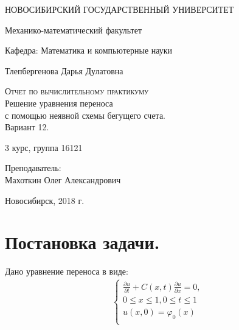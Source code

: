 \documentclass[12pt,a4paper]{scrartcl}
\begin{document}
	\begin{titlepage}
		\begin{center}
			
			\vspace{0.5cm}
			
			НОВОСИБИРСКИЙ ГОСУДАРСТВЕННЫЙ УНИВЕРСИТЕТ
			\vspace{0.25cm}
			
			Механико-математический факультет
			
			Кафедра: Математика и компьютерные науки
			\vfill
			
			
			Тлепбергенова Дарья Дулатовна
			\vfill
			
			\textsc{Отчет по вычислительному практикуму}\\[5mm]
			
			{\LARGE Решение уравнения переноса\\
				с помощью неявной схемы бегущего счета.\\
				Вариант 12.\\[2mm]}
			\bigskip
			
			3 курс, группа 16121
		\end{center}
		\vfill
		\newlength{\ML}
		\hfill\begin{minipage}{0.4\textwidth}
			Преподаватель:\\
			Махоткин Олег Александрович
		\end{minipage}%
		\bigskip
		
		\vfill
		\begin{center}
			Новосибирск, 2018 г.
		\end{center}
	\end{titlepage}
	
	\newpage
	\section{Постановка задачи.}
	Дано уравнение переноса в виде:
	\begin{align}\label{main}
	\begin{cases}
	\frac{\partial u}{\partial t}+C(x,t) \frac{\partial u}{\partial x}=0, \\
	0\le x \le 1, 0\le t \le1 \\        
	u(x,0)=\varphi_{0}(x) \\
	\end{cases}
	\end{align}
	
\end{document}
